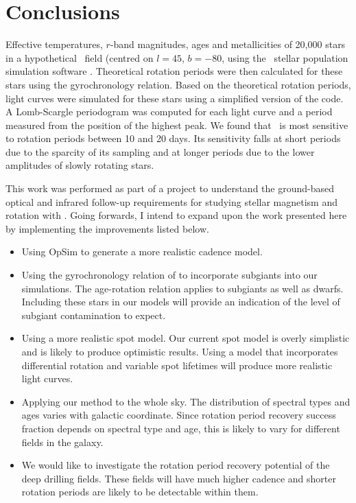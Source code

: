 \section{Conclusions}
Effective temperatures, $r$-band magnitudes, ages and metallicities of 20,000
stars in a hypothetical \LSST\ field (centred on $l=45$, $b=-80$, using the
\trilegal\ stellar population simulation software \citep{Girardi2012}.
Theoretical rotation periods were then calculated for these stars using the
\citep{Angus2015} gyrochronology relation.
Based on the theoretical rotation periods, light curves were simulated for
these stars using a simplified version of the \citep{Aigrain2015} code.
A Lomb-Scargle periodogram was computed for each light curve and a period
measured from the position of the highest peak.
We found that \LSST\ is most sensitive to rotation periods between 10 and 20
days.
Its sensitivity falls at short periods due to the sparcity of its sampling and
at longer periods due to the lower amplitudes of slowly rotating stars.

This work was performed as part of a project to understand the ground-based
optical and infrared follow-up requirements for studying stellar magnetism and
rotation with \LSST.
Going forwards, I intend to expand upon the work presented here by
implementing the improvements listed below.
\begin{itemize}
\item{Using OpSim to generate a more realistic cadence model.}
\item{Using the gyrochronology relation of \citet{Vansaders2013} to
incorporate subgiants into our simulations.
The \citet{Vansaders2013} age-rotation relation applies to subgiants as well
as dwarfs.
Including these stars in our models will provide an indication of the level of
subgiant contamination to expect.}
\item{Using a more realistic spot model.
Our current spot model is overly simplistic and is likely to produce
optimistic results.
Using a model that incorporates differential rotation and variable spot
lifetimes will produce more realistic light curves.}
\item{Applying our method to the whole sky.
The distribution of spectral types and ages varies with galactic coordinate.
Since rotation period recovery success fraction depends on spectral type and
age, this is likely to vary for different fields in the galaxy.}
\item{We would like to investigate the rotation period recovery potential of
the deep drilling fields.
These fields will have much higher cadence and shorter rotation periods are
likely to be detectable within them.}
\end{itemize}
